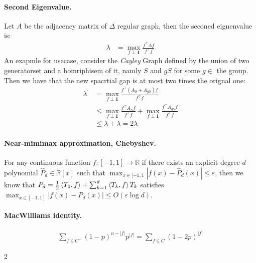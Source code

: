 \documentclass{article}
\begin{document}
\begin{multicols*}{2}
  \paragraph{Second Eigenvalue.} Let $A$ be the adjacency matrix of $\Delta$ regular graph, then the seconed eignenvalue is:
  \begin{equation*}
    \begin{split}
      \lambda &= \max_{f \perp \mathbf{1}} { \frac{f^{\top}A f  }{ f^{\top}f}}
    \end{split}
  \end{equation*}
  An exapmle for usecase, consider the \emph{Cayley} Graph defined by the union of two generatorset and a homriphisem of it, namly $S$ and $gS$ for some $g \in $ the group. Then we have that the new spacrtial gap is at most two times the orignal one:    
  \begin{equation*}
    \begin{split}	
      \lambda^{\prime} &= \max_{f \perp \mathbf{1}} { \frac{f^{\top} \left( A_{S} + A_{gS} \right) f  }{ f^{\top}f}} \\
      & \le  \max_{f \perp \mathbf{1}} { \frac{f^{\top}A_{S} f  }{ f^{\top}f}} +  \max_{f \perp \mathbf{1}} { \frac{f^{\top}A_{gS} f  }{ f^{\top}f}} \\
      & \le \lambda + \lambda = 2\lambda
    \end{split}
  \end{equation*}
  \paragraph{Near-mimimax approximation, Chebyshev.} For any continuous function $f:[-1,1] \rightarrow \mathbb{R}$ if there exists an explicit degree-$d$ polynomial $\hat{P}_{d} \in \mathbb{R}[x]$ such that $\max_{x\in [-1,1} | f(x) - \hat{P}_{d}(x) | \le \varepsilon$, then we know that $P_{d} = \frac{1}{2}\braket{ T_{0},f} + \sum^{d}_{k=1}\braket{T_{k}, f}T_{k}$ satisfies $\max_{x\in [-1,1]}|f(x) - P_{d}(x)| \le O(\varepsilon\log d)$. 
    \paragraph{MacWilliams identity.}
    
    \begin{equation*}
      \begin{split}
        \sum_{f \in C^{\perp}}{\left( 1 - p  \right)^{n -|f|}p^{|f|}} = \sum_{f \in C}{\left( 1 - 2p  \right)^{|f|}}
      \end{split}
    \end{equation*}
\end{multicols*}{2}
\end{document}
